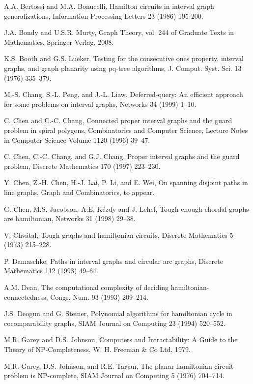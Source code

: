 \documentclass{llncs}
\begin{document}
\begin{theorem}
\begin{thebibliography}{10}
A.A. Bertossi and M.A. Bonucelli,
Hamilton circuits in interval graph generalizations,
Information Processing Letters 23 (1986) 195-200.

J.A. Bondy and U.S.R. Murty, Graph Theory, vol. 244 of Graduate Texts in Mathematics, Springer Verlag, 2008.

K.S. Booth and G.S. Lueker, Testing for the consecutive ones property, interval graphs, and graph planarity using pq-tree algorithms, J. Comput. Syst. Sci. 13 (1976) 335--379.

M.-S. Chang, S.-L. Peng, and J.-L. Liaw,
Deferred-query: An efficient approach for some problems on interval graphs, Networks 34 (1999) 1--10.

C. Chen and C.-C. Chang, Connected proper interval graphs and the guard problem in spiral polygons,  Combinatorics and Computer Science, Lecture Notes in Computer Science Volume 1120 (1996) 39--47.

C. Chen, C.-C. Chang, and G.J. Chang, Proper interval graphs and the guard problem, Discrete Mathematics 170 (1997) 223--230.

Y. Chen, Z.-H. Chen, H.-J. Lai, P. Li, and E. Wei, On spanning disjoint paths in line graphs, Graph and Combinatorics, to appear.

G. Chen, M.S. Jacobson, A.E. K\'ezdy and J. Lehel,  Tough enough chordal graphs are hamiltonian, Networks 31 (1998) 29--38.

V. Chv\'atal, Tough graphs and hamiltonian circuits, Discrete Mathematics 5 (1973) 215--228.

P. Damaschke, Paths in interval graphs and circular arc graphs, Discrete Mathematics 112 (1993) 49--64.

A.M. Dean, The computational complexity of deciding hamiltonian-connectedness, Congr. Num. 93 (1993) 209--214.

J.S. Deogun and G. Steiner, Polynomial algorithms for hamiltonian cycle in cocomparability graphs, SIAM Journal on Computing 23 (1994) 520--552.

M.R. Garey and D.S. Johnson, Computers and Intractability: A Guide to the Theory of NP-Completeness, W. H. Freeman \& Co Ltd, 1979.

M.R. Garey, D.S. Johnson, and R.E. Tarjan, The planar hamiltonian circuit problem is NP-complete, SIAM Journal on Computing 5 (1976) 704--714.


\end{thebibliography}
\end{theorem}
\end{document}
